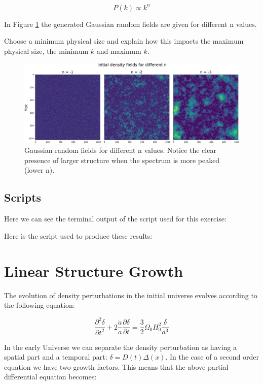 \documentclass[a4paper,10pt]{article}
\begin{document}
\begin{equation}
P(k) \propto k^n
\end{equation}

In Figure \ref{fig:2} the generated Gaussian random fields are given for different n values. 

\color{red}
Choose a minimum physical size and explain how this impacts the maximum physical size, the minimum $k$ and maximum $k$. 

\color{black}

\begin{figure}[h!]
  \centering
  \includegraphics[width=0.8\linewidth]{./plots/2.png}
  \caption{Gaussian random fields for different n values. Notice the clear presence of larger structure when the spectrum is more peaked (lower n).}
  \label{fig:2}
\end{figure}

\subsection{Scripts}

Here we can see the terminal output of the script used for this exercise:


Here is the script used to produce these results: 


\section{Linear Structure Growth}

The evolution of density perturbations in the initial universe evolves according to the following equation: 

\begin{equation}
\frac{\partial^2\delta}{\partial t^2} + 2\frac{\dot{a}}{a}\frac{\partial\delta}{\partial t} = \frac{3}{2}\Omega_0H_0^2\frac{\delta}{a^3}
\end{equation}

In the early Universe we can separate the density perturbation as having a spatial part and a temporal part: $\delta = D(t)\Delta(x)$. In the case of a second order equation we have two growth factors. This means that the above partial differential equation becomes: 
\end{document}
